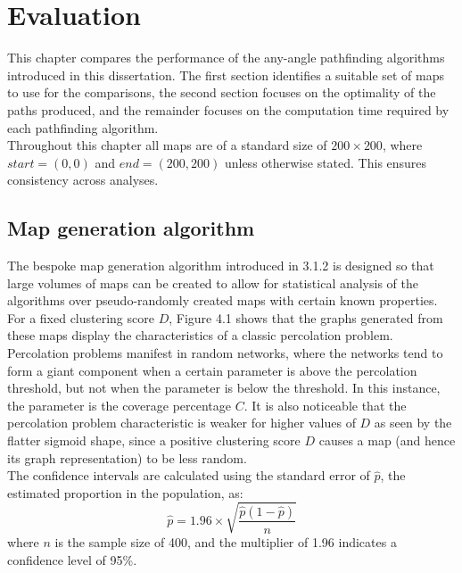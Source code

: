 \documentclass[12pt,notitlepage]{report}
\begin{document}
\chapter{Evaluation}

This chapter compares the performance of the any-angle pathfinding algorithms introduced in this dissertation. The first section identifies a suitable set of maps to use for the comparisons, the second section focuses on the optimality of the paths produced, and the remainder focuses on the computation time required by each pathfinding algorithm.\\

\noindent
Throughout this chapter all maps are of a standard size of $200 \times 200$, where $start=(0,0)$ and $end=(200,200)$ unless otherwise stated. This ensures consistency across analyses.

\section{Map generation algorithm}

The bespoke map generation algorithm introduced in 3.1.2 is designed so that large volumes of maps can be created to allow for statistical analysis of the algorithms over pseudo-randomly created maps with certain known properties.\\

\noindent
For a fixed clustering score $D$, Figure 4.1 shows that the graphs generated from these maps display the characteristics of a classic percolation problem\cite{Grimmett99}. Percolation problems manifest in random networks, where the networks tend to form a giant component when a certain parameter is above the percolation threshold, but not when the parameter is below the threshold. In this instance, the parameter is the coverage percentage $C$. It is also noticeable that the percolation problem characteristic is weaker for higher values of $D$ as seen by the flatter sigmoid shape, since a positive clustering score $D$ causes a map (and hence its graph representation) to be less random.\\

\noindent
The confidence intervals are calculated using the standard error of $\hat{p}$, the estimated proportion in the population\cite{PennState}, as:
\begin{equation}
\hat{p} = 1.96 \times \sqrt{\frac{\hat{p}(1-\hat{p})}{n}}
\end{equation}
where $n$ is the sample size of 400, and the multiplier of 1.96 indicates a confidence level of 95\%.\\
\end{document}

